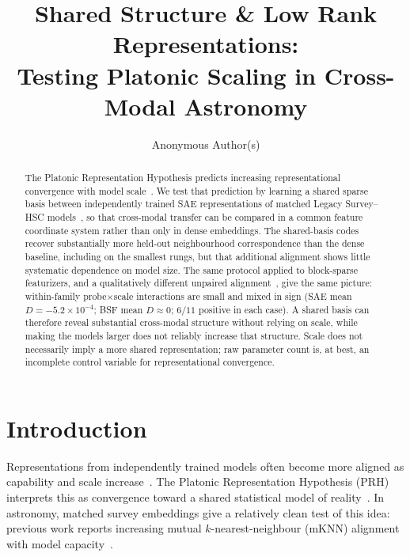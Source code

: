\documentclass{article}
\title{Shared Structure \& Low Rank Representations:\\
Testing Platonic Scaling in Cross-Modal Astronomy}
\author{Anonymous Author(s)}
\begin{document}
\maketitle

\begin{abstract}
The Platonic Representation Hypothesis predicts increasing representational convergence with model scale~\citep{huh2024platonic}.
We test that prediction by learning a shared sparse basis between independently trained SAE representations of matched Legacy Survey--HSC models~\citep{duraphe2025platonicuniverse}, so that cross-modal transfer can be compared in a common feature coordinate system rather than only in dense embeddings.
The shared-basis codes recover substantially more held-out neighbourhood correspondence than the dense baseline, including on the smallest rungs, but that additional alignment shows little systematic dependence on model size.
The same protocol applied to block-sparse featurizers, and a qualitatively different unpaired alignment~\citep{jha2025vec2vec}, give the same picture: within-family probe\(\times\)scale interactions are small and mixed in sign (SAE mean \(D{=}{-}5.2{\times}10^{-4}\); BSF mean \(D{\approx}0\); \(6/11\) positive in each case).
A shared basis can therefore reveal substantial cross-modal structure without relying on scale, while making the models larger does not reliably increase that structure.
Scale does not necessarily imply a more shared representation; raw parameter count is, at best, an incomplete control variable for representational convergence.
\end{abstract}

\section{Introduction}
\label{sec:intro}

Representations from independently trained models often become more aligned as capability and scale increase~\citep{huh2024platonic}.
The Platonic Representation Hypothesis (PRH) interprets this as convergence toward a shared statistical model of reality~\citep{huh2024platonic}.
In astronomy, matched survey embeddings give a relatively clean test of this idea: previous work reports increasing mutual \(k\)-nearest-neighbour (mKNN) alignment with model capacity~\citep{duraphe2025platonicuniverse}.
\end{document}

